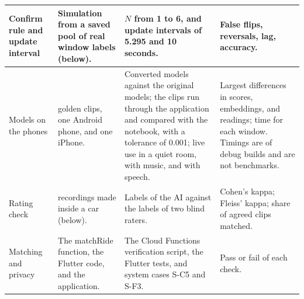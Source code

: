 {\begin{longtable}{|>{\raggedright\arraybackslash}p{}|>{\raggedright\arraybackslash}p{}|>{\raggedright\arraybackslash}p{}|>{\raggedright\arraybackslash}p{}|}
\hline
Confirm rule and update interval & Simulation from a saved pool of real window labels (below). & $N$ from 1 to 6, and update intervals of 5.295 and 10 seconds. & False flips, reversals, lag, accuracy. \\
\hline
Models on the phones & 10 golden clips, one Android phone, and one iPhone. & Converted models against the original models; the clips run through the application and compared with the notebook, with a tolerance of 0.001; live use in a quiet room, with music, and with speech. & Largest differences in scores, embeddings, and readings; time for each window. Timings are of debug builds and are not benchmarks. \\
\hline
Rating check & 30 recordings made inside a car (below). & Labels of the AI against the labels of two blind raters. & Cohen's kappa; Fleiss' kappa; share of agreed clips matched. \\
\hline
Matching and privacy & The matchRide function, the Flutter code, and the application. & The Cloud Functions verification script, the Flutter tests, and system cases S-C5 and S-F3. & Pass or fail of each check. \\
\hline
\end{longtable}
}

